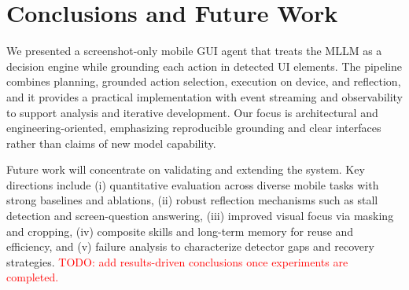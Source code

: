\section{Conclusions and Future Work}
\label{conclusion}

We presented a screenshot-only mobile GUI agent that treats the MLLM as a decision engine while grounding each action in detected UI elements. The pipeline combines planning, grounded action selection, execution on device, and reflection, and it provides a practical implementation with event streaming and observability to support analysis and iterative development. Our focus is architectural and engineering-oriented, emphasizing reproducible grounding and clear interfaces rather than claims of new model capability.

Future work will concentrate on validating and extending the system. Key directions include (i) quantitative evaluation across diverse mobile tasks with strong baselines and ablations, (ii) robust reflection mechanisms such as stall detection and screen-question answering, (iii) improved visual focus via masking and cropping, (iv) composite skills and long-term memory for reuse and efficiency, and (v) failure analysis to characterize detector gaps and recovery strategies. \textcolor{red}{TODO: add results-driven conclusions once experiments are completed.}
